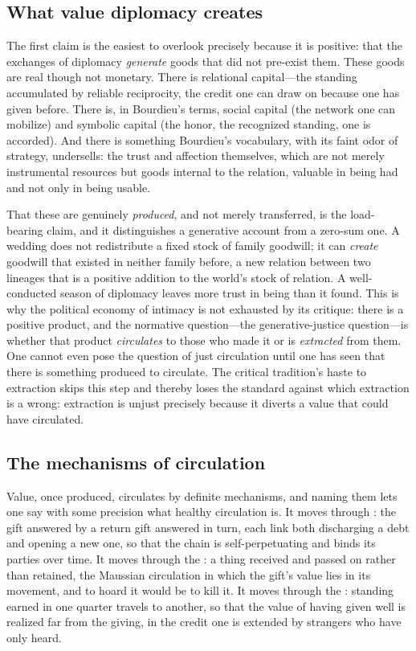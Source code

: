 \subsection{What value diplomacy creates}
The first claim is the easiest to overlook precisely because it is positive: that the exchanges of diplomacy \emph{generate} goods that did not pre-exist them. These goods are real though not monetary. There is relational capital---the standing accumulated by reliable reciprocity, the credit one can draw on because one has given before. There is, in Bourdieu's terms, social capital (the network one can mobilize) and symbolic capital (the honor, the recognized standing, one is accorded). And there is something Bourdieu's vocabulary, with its faint odor of strategy, undersells: the trust and affection themselves, which are not merely instrumental resources but goods internal to the relation, valuable in being had and not only in being usable.

That these are genuinely \emph{produced}, and not merely transferred, is the load-bearing claim, and it distinguishes a generative account from a zero-sum one. A wedding does not redistribute a fixed stock of family goodwill; it can \emph{create} goodwill that existed in neither family before, a new relation between two lineages that is a positive addition to the world's stock of relation. A well-conducted season of diplomacy leaves more trust in being than it found. This is why the political economy of intimacy is not exhausted by its critique: there is a positive product, and the normative question---the generative-justice question---is whether that product \emph{circulates} to those who made it or is \emph{extracted} from them. One cannot even pose the question of just circulation until one has seen that there is something produced to circulate. The critical tradition's haste to extraction skips this step and thereby loses the standard against which extraction is a wrong: extraction is unjust precisely because it diverts a value that could have circulated.

\subsection{The mechanisms of circulation}
Value, once produced, circulates by definite mechanisms, and naming them lets one say with some precision what healthy circulation is. It moves through : the gift answered by a return gift answered in turn, each link both discharging a debt and opening a new one, so that the chain is self-perpetuating and binds its parties over time. It moves through the : a thing received and passed on rather than retained, the Maussian circulation in which the gift's value lies in its movement, and to hoard it would be to kill it. It moves through the : standing earned in one quarter travels to another, so that the value of having given well is realized far from the giving, in the credit one is extended by strangers who have only heard.

